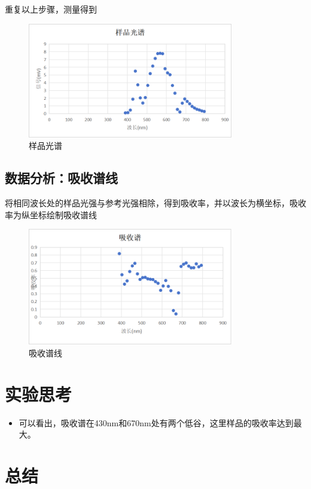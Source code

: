 \documentclass{ctexart}
\begin{document}
重复以上步骤，测量得到
\begin{figure}[H]
    \centering
    \includegraphics[width=0.8\textwidth]{pictures/图片2.png}
    \caption{样品光谱}
\end{figure}

\subsection{数据分析：吸收谱线}
将相同波长处的样品光强与参考光强相除，得到吸收率，并以波长为横坐标，吸收率为纵坐标绘制吸收谱线
\begin{figure}[H]
    \centering
    \includegraphics[width=0.8\textwidth]{pictures/图片3.png}
    \caption{吸收谱线}
\end{figure}

\section{实验思考}
\begin{itemize}
    \item 可以看出，吸收谱在430nm和670nm处有两个低谷，这里样品的吸收率达到最大。
\end{itemize}
\section{总结}
\end{document}

